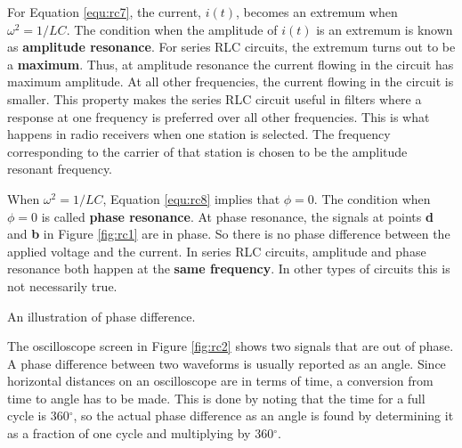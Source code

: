 For Equation \ref{equ:rc7}, the current, $i(t)$, becomes an extremum when $\omega^2 = 1/LC$. The condition when the amplitude of $i(t)$ is an extremum is known as {\bf amplitude resonance}. For series RLC circuits, the extremum turns out to be a {\bf maximum}. Thus, at amplitude resonance the current flowing in the circuit has maximum amplitude. At all other frequencies, the current flowing in the circuit is smaller. This property makes the series RLC circuit useful in filters where a response at one frequency is preferred over all other frequencies. This is what happens in radio receivers when one station is selected. The frequency corresponding to the carrier of that station is chosen to be the amplitude resonant frequency.

When $\omega^2 = 1/LC$, Equation \ref{equ:rc8} implies that $\phi = 0$. The condition when $\phi  = 0$ is called {\bf phase resonance}. At phase resonance, the signals at points {\bf d} and {\bf b} in Figure \ref{fig:rc1} are in phase. So there is no phase difference between the applied voltage and the current. In series RLC circuits, amplitude and phase resonance both happen at the {\bf same frequency}. In other types of circuits this is not necessarily true.

\begin{marginfigure}
\caption{An illustration of phase difference.}
\label{fig:rc2}
\end{marginfigure}

The oscilloscope screen in Figure \ref{fig:rc2} shows two signals that are out of phase. A phase difference between two waveforms is usually reported as an angle. Since horizontal distances on an oscilloscope are in terms of time, a conversion from time to angle has to be made. This is done by noting that the time for a full cycle is 360$^{\circ}$, so the actual phase difference as an angle is found by determining it as a fraction of one cycle and multiplying by 360$^{\circ}$.

